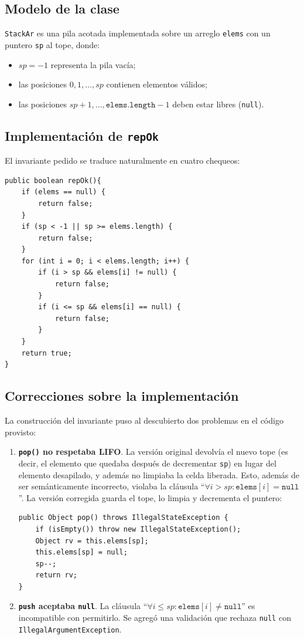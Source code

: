 \documentclass[12pt,a4paper]{article}
\begin{document}
\subsection{Modelo de la clase}
\texttt{StackAr} es una pila acotada implementada sobre un arreglo \texttt{elems} con un puntero \texttt{sp} al tope, donde:
\begin{itemize}
  \item $sp = -1$ representa la pila vacía;
  \item las posiciones $0, 1, \dots, sp$ contienen elementos válidos;
  \item las posiciones $sp+1, \dots, \texttt{elems.length} - 1$ deben estar libres (\texttt{null}).
\end{itemize}

\subsection{Implementación de \texttt{repOk}}
El invariante pedido se traduce naturalmente en cuatro chequeos:
\begin{lstlisting}[style=javastyle]
public boolean repOk(){
    if (elems == null) {
        return false;
    }
    if (sp < -1 || sp >= elems.length) {
        return false;
    }
    for (int i = 0; i < elems.length; i++) {
        if (i > sp && elems[i] != null) {
            return false;
        }
        if (i <= sp && elems[i] == null) {
            return false;
        }
    }
    return true;
}
\end{lstlisting}

\subsection{Correcciones sobre la implementación}
La construcción del invariante puso al descubierto dos problemas en el código provisto:
\begin{enumerate}
  \item \textbf{\texttt{pop()} no respetaba LIFO}. La versión original devolvía el nuevo tope (es decir, el elemento que quedaba después de decrementar \texttt{sp}) en lugar del elemento desapilado, y además no limpiaba la celda liberada. Esto, además de ser semánticamente incorrecto, violaba la cláusula ``$\forall i > sp: \texttt{elems}[i] = \texttt{null}$''. La versión corregida guarda el tope, lo limpia y decrementa el puntero:
\begin{lstlisting}[style=javastyle]
public Object pop() throws IllegalStateException {
    if (isEmpty()) throw new IllegalStateException();
    Object rv = this.elems[sp];
    this.elems[sp] = null;
    sp--;
    return rv;
}
\end{lstlisting}
  \item \textbf{\texttt{push} aceptaba \texttt{null}}. La cláusula ``$\forall i \le sp: \texttt{elems}[i] \neq \texttt{null}$'' es incompatible con permitirlo. Se agregó una validación que rechaza \texttt{null} con \texttt{IllegalArgumentException}.
\end{enumerate}
\end{document}
